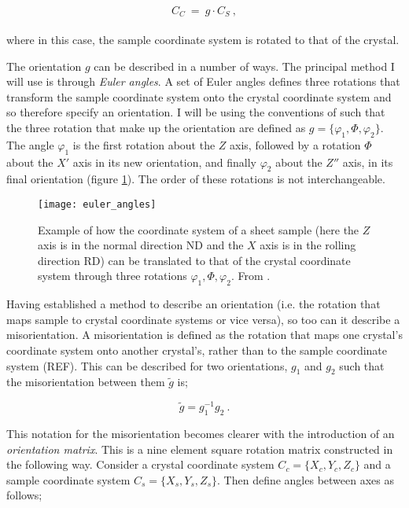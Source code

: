 \documentclass[a4paper,12pt]{report}
\numberwithin{equation}{chapter}
\begin{document}
\begin{equation}
C_C\ =\ g \cdot C_S\ ,
\end{equation}  
\\
where in this case, the sample coordinate system is rotated to that of the crystal.




The orientation $g$ can be described in a number of ways. The principal method I will use is through \emph{Euler angles}. A set of Euler angles defines three rotations that transform the sample coordinate system onto the crystal coordinate system and so therefore specify an orientation. I will be using the conventions of \cite{bunge1982texture} such that the three rotation that make up the orientation are defined as $g = \{\varphi_1,\Phi,\varphi_2\}$. The angle $\varphi_1$ is the first rotation about the $Z$ axis, followed by a rotation $\Phi$ about the $X'$ axis in its new orientation, and finally $\varphi_2$ about the $Z''$ axis, in its final orientation (figure \ref{fig:euler_angles}). The order of these rotations is not interchangeable.




\begin{figure}[h!]
  \centering
    \texttt{[image: euler\_angles]}
  \caption[Euler angle description]{Example of how the coordinate system of a sheet sample (here the $Z$ axis is in the normal direction ND and the $X$ axis is in the rolling direction RD) can be translated to that of the crystal coordinate system through three rotations $\varphi_1,\Phi,\varphi_2$. From \cite{Randle2000}.}
  \label{fig:euler_angles}
\end{figure}

Having established a method to describe an orientation (i.e. the rotation that maps sample to crystal coordinate systems or vice versa), so too can it describe a misorientation. A misorientation is defined as the rotation that maps one crystal's coordinate system onto another crystal's, rather than to the sample coordinate system (REF). This can be described for two orientations, $g_1$ and $g_2$ such that the misorientation between them $\tilde{g}$ is;

\begin{equation} \label{eq:misor_matrix}
\tilde{g} = g_1^{-1}g_2\ .
\end{equation} 

This notation for the misorientation becomes clearer with the introduction of an \emph{orientation matrix}. This is a nine element square rotation matrix constructed in the following way. Consider a crystal coordinate system $C_c = \{X_c,Y_c,Z_c\}$ and a sample coordinate system $C_s = \{X_s,Y_s,Z_s\}$. Then define angles between axes as follows;
\end{document}
